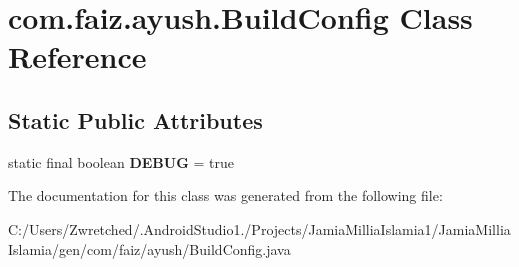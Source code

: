 \hypertarget{classcom_1_1faiz_1_1ayush_1_1_build_config}{}\section{com.\+faiz.\+ayush.\+Build\+Config Class Reference}
\label{classcom_1_1faiz_1_1ayush_1_1_build_config}
\subsection*{Static Public Attributes}
\begin{DoxyCompactItemize}
\item 
\hypertarget{classcom_1_1faiz_1_1ayush_1_1_build_config_ad8d95e855fd53ce89c0c04aa45550859}{}static final boolean {\bfseries D\+E\+B\+U\+G} = true\label{classcom_1_1faiz_1_1ayush_1_1_build_config_ad8d95e855fd53ce89c0c04aa45550859}

\end{DoxyCompactItemize}


The documentation for this class was generated from the following file\+:\begin{DoxyCompactItemize}
\item 
C\+:/\+Users/\+Zwretched/.\+Android\+Studio1./\+Projects/\+Jamia\+Millia\+Islamia1/\+Jamia\+Millia\+Islamia/gen/com/faiz/ayush/Build\+Config.\+java\end{DoxyCompactItemize}
